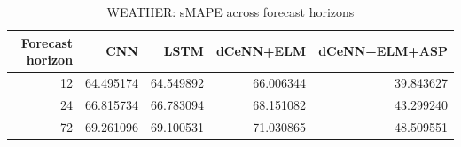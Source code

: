 \begin{table}
\caption{WEATHER: sMAPE across forecast horizons}
\begin{tabular}{rrrrr}
\toprule
Forecast horizon & CNN & LSTM & dCeNN+ELM & dCeNN+ELM+ASP \\
\midrule
12 & 64.495174 & 64.549892 & 66.006344 & 39.843627 \\
24 & 66.815734 & 66.783094 & 68.151082 & 43.299240 \\
72 & 69.261096 & 69.100531 & 71.030865 & 48.509551 \\
\bottomrule
\end{tabular}
\end{table}
